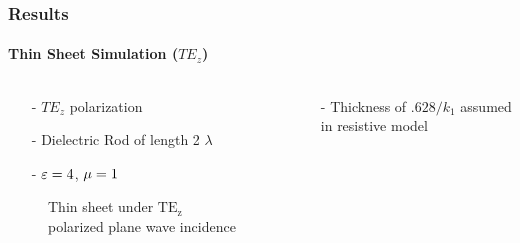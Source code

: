 \documentclass[mathserif,18pt,xcolor=table]{beamer}
\begin{document}
\begin{frame}
  \frametitle{Results}
  \framesubtitle{Thin Sheet Simulation ($TE_z$)}
  \begin{columns}[T] %
    \begin{column}{.5\textwidth}
      \begin{itemize}
        \item[-]{$TE_z$ polarization}
        \item[-]{Dielectric Rod of length 2 $\lambda$}
        \item[-]{$\varepsilon = 4$, $\mu = 1$}
      \end{itemize}
      \begin{figure}[h]
        \normalsize
        \centering
        
        \caption{Thin sheet under $\mathrm{TE_z}$ polarized plane wave incidence}
        \label{fig:te_plate}
      \end{figure}
    \end{column}
    \begin{column}[T]{.5\textwidth}
      \begin{figure}
        \vspace*{-2cm}
        
        \label{fig:TE_rcs}
      \end{figure}
      \begin{itemize}
        \item[-]{Thickness of $.628/k_1$ assumed in resistive model}
      \end{itemize}
      \end{column}%
  \end{columns}
\end{frame}
\end{document}
